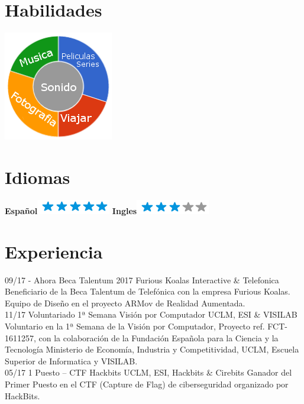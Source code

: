 \documentclass[]{friggeri-cv}
\begin{document}
\begin{aside}
  \section{Habilidades}
    \includegraphics[scale=0.62]{img/personal.png}
    ~
    \section{Idiomas}
    \textbf{Español}\includegraphics[scale=0.40]{img/5stars.png}
    \textbf{Ingles}\includegraphics[scale=0.40]{img/3stars.png}
    ~
\end{aside}

\section{Experiencia}
\begin{entrylist}
  \entry
    {09/17 - Ahora}
    {Beca Talentum 2017}
    {Furious Koalas Interactive \& Telefonica}
    {Beneficiario de la Beca Talentum de Telefónica con la empresa Furious Koalas. Equipo de Diseño en el proyecto ARMov de Realidad Aumentada.\\}
  \entry
    {11/17}
    {Voluntariado 1ª Semana Visión por Computador}
    {UCLM, ESI \& VISILAB}
    {Voluntario en la 1ª Semana de la Visión por Computador, Proyecto ref. FCT-1611257, con la colaboración de la Fundación Española para la Ciencia y la Tecnología Ministerio de Economía, Industria y Competitividad, UCLM, Escuela Superior de Informatica y VISILAB.\\}
    \entry
    {05/17}
    {1 Puesto – CTF Hackbits}
    {UCLM, ESI, Hackbits \& Cirebits}
    {Ganador del Primer Puesto en el CTF (Capture de Flag) de ciberseguridad organizado por HackBits.\\}
\end{entrylist}
\end{document}
